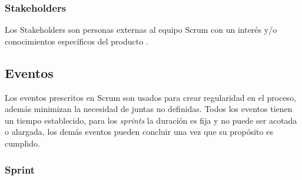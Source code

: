 \begin{quote}
    \end{quote}

\subsubsection{Stakeholders}

 Los Stakeholders son personas externas al equipo Scrum con un interés y/o conocimientos
 específicos del producto \cite{ScrumGlosary}. 



\subsection{Eventos}

 Los eventos prescritos en Scrum son usados para crear regularidad en el proceso, además
 minimizan la necesidad de juntas no definidas. Todos los eventos tienen un tiempo establecido, 
 para los {\it sprints} la duración es fija y no puede ser acotada o alargada, los demás eventos
 pueden concluir una vez que su propósito es cumplido.

\subsubsection{Sprint}

